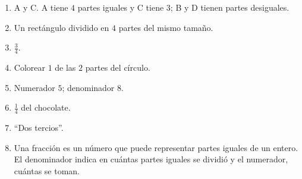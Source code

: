 \wbanswers{\wbLReview}
\begin{enumerate}
\item A y C. A tiene $4$ partes iguales y C tiene $3$; B y D tienen partes desiguales.
\item Un rectángulo dividido en $4$ partes del mismo tamaño.
\item $\frac{3}{4}$.
\item Colorear $1$ de las $2$ partes del círculo.
\item Numerador $5$; denominador $8$.
\item $\frac{1}{4}$ del chocolate.
\item ``Dos tercios''.
\item Una fracción es un número que puede representar partes iguales de un entero. El denominador indica en cuántas partes iguales se dividió y el numerador, cuántas se toman.
\end{enumerate}
